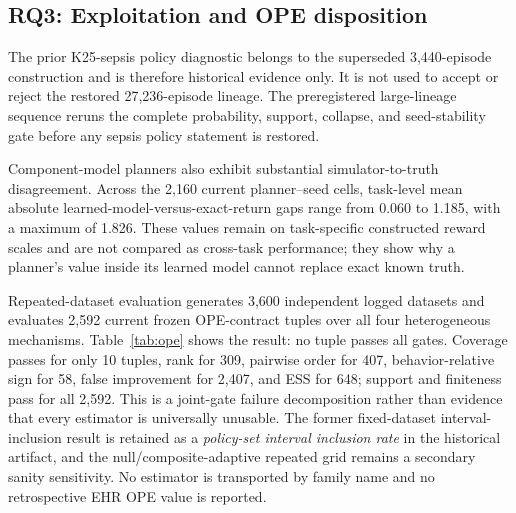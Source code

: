 \documentclass[sigconf,review]{acmart}
\begin{document}
\subsection{RQ3: Exploitation and OPE disposition}

The prior K25-sepsis policy diagnostic belongs to the superseded 3,440-episode construction and is therefore historical evidence only. It is not used to accept or reject the restored 27,236-episode lineage. The preregistered large-lineage sequence reruns the complete probability, support, collapse, and seed-stability gate before any sepsis policy statement is restored.

Component-model planners also exhibit substantial simulator-to-truth disagreement. Across the 2,160 current planner--seed cells, task-level mean absolute learned-model-versus-exact-return gaps range from 0.060 to 1.185, with a maximum of 1.826. These values remain on task-specific constructed reward scales and are not compared as cross-task performance; they show why a planner's value inside its learned model cannot replace exact known truth.

Repeated-dataset evaluation generates 3,600 independent logged datasets and evaluates 2,592 current frozen OPE-contract tuples over all four heterogeneous mechanisms. Table~\ref{tab:ope} shows the result: no tuple passes all gates. Coverage passes for only 10 tuples, rank for 309, pairwise order for 407, behavior-relative sign for 58, false improvement for 2,407, and ESS for 648; support and finiteness pass for all 2,592. This is a joint-gate failure decomposition rather than evidence that every estimator is universally unusable. The former fixed-dataset interval-inclusion result is retained as a \emph{policy-set interval inclusion rate} in the historical artifact, and the null/composite-adaptive repeated grid remains a secondary sanity sensitivity. No estimator is transported by family name and no retrospective EHR OPE value is reported.
\end{document}
